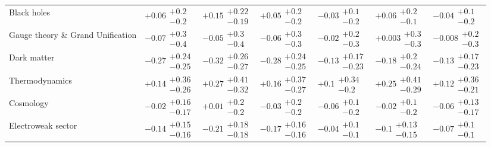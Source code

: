 \begin{table}[H]
\begin{tabular}{lllllll}
Black holes & $+0.06\substack{+0.2 \\ -0.2}$ & $+0.15\substack{+0.22 \\ -0.19}$ & $+0.05\substack{+0.2 \\ -0.2}$ & $-0.03\substack{+0.1 \\ -0.2}$ & $+0.06\substack{+0.2 \\ -0.1}$ & $-0.04\substack{+0.1 \\ -0.2}$ \\
Gauge theory \& Grand Unification & $-0.07\substack{+0.3 \\ -0.4}$ & $-0.05\substack{+0.3 \\ -0.4}$ & $-0.06\substack{+0.3 \\ -0.3}$ & $-0.02\substack{+0.2 \\ -0.3}$ & $+0.003\substack{+0.3 \\ -0.3}$ & $-0.008\substack{+0.2 \\ -0.3}$ \\
Dark matter & $\bm{-0.27}\substack{+0.24 \\ -0.25}$ & $\bm{-0.32}\substack{+0.26 \\ -0.27}$ & $\bm{-0.28}\substack{+0.24 \\ -0.25}$ & $-0.13\substack{+0.17 \\ -0.23}$ & $-0.18\substack{+0.2 \\ -0.24}$ & $-0.13\substack{+0.17 \\ -0.23}$ \\
Thermodynamics & $+0.14\substack{+0.36 \\ -0.26}$ & $+0.27\substack{+0.41 \\ -0.32}$ & $+0.16\substack{+0.37 \\ -0.27}$ & $+0.1\substack{+0.34 \\ -0.2}$ & $+0.25\substack{+0.41 \\ -0.29}$ & $+0.12\substack{+0.36 \\ -0.21}$ \\
Cosmology & $-0.02\substack{+0.16 \\ -0.17}$ & $+0.01\substack{+0.2 \\ -0.2}$ & $-0.03\substack{+0.2 \\ -0.2}$ & $-0.06\substack{+0.1 \\ -0.2}$ & $-0.02\substack{+0.1 \\ -0.2}$ & $-0.06\substack{+0.13 \\ -0.17}$ \\
Electroweak sector & $-0.14\substack{+0.15 \\ -0.16}$ & $\bm{-0.21}\substack{+0.18 \\ -0.18}$ & $\bm{-0.17}\substack{+0.16 \\ -0.16}$ & $-0.04\substack{+0.1 \\ -0.1}$ & $-0.1\substack{+0.13 \\ -0.15}$ & $-0.07\substack{+0.1 \\ -0.1}$ \\

\end{tabular}
\end{table}
